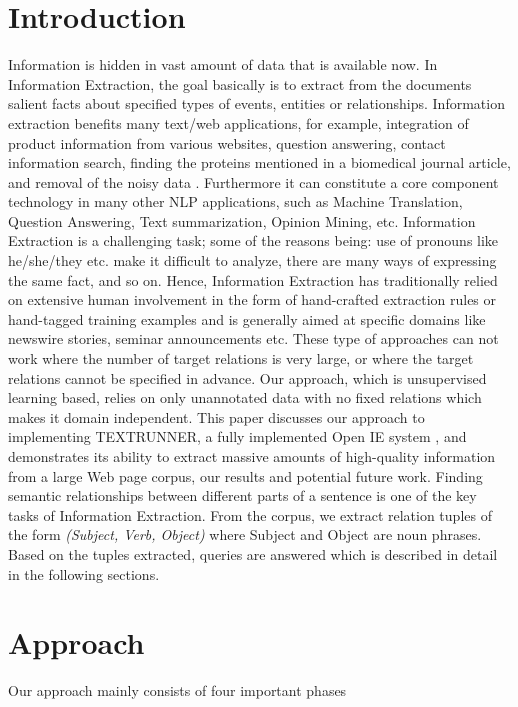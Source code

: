 \documentclass{article}
\begin{document}
\section{Introduction}
Information is hidden in vast amount of data that is available now. In Information Extraction, the goal basically is to extract from the documents salient facts about specified types of events, entities or relationships.  Information extraction benefits many text/web applications, for example, integration of product information from various websites, question answering, contact information search, finding the proteins mentioned in a biomedical journal article, and removal of the noisy data \cite{Tang_informationextraction}. Furthermore it can constitute a core component technology in many other NLP applications, such as Machine Translation, Question Answering, Text summarization, Opinion Mining, etc.  Information Extraction is a challenging task; some of the reasons being: use of pronouns like he/she/they etc. make it difficult to analyze, there are many ways of expressing the same fact, and so on. Hence, Information Extraction has traditionally relied on extensive human involvement in the form of hand-crafted extraction rules or hand-tagged training examples and is generally aimed at specific domains like newswire stories, seminar announcements etc. These type of approaches can not work where the number of target relations is very large, or where the target relations cannot be specified in advance. Our approach, which is unsupervised learning based, relies on only unannotated data with no fixed relations which makes it domain independent. This paper discusses our approach to implementing TEXTRUNNER, a fully implemented Open IE system \cite{Banko}, and demonstrates its ability to extract massive amounts of high-quality information from a large Web page corpus, our results and potential future work. Finding semantic relationships between different parts of a sentence is one of the key tasks of Information Extraction. From the corpus, we extract relation tuples of the form \textit{(Subject, Verb, Object)} where Subject and Object are noun phrases. Based on the tuples extracted, queries are answered which is described in detail in the following sections.
 

\section{Approach}
Our approach mainly consists of four important phases
\end{document}
